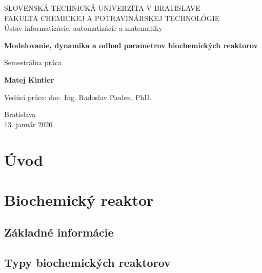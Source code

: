 \documentclass[fleqn]{article}
\begin{document}
	
\begin{titlepage}
	\begin{center}
		\vspace*{1cm}
		\LARGE
		SLOVENSKÁ TECHNICKÁ UNIVERZITA V BRATISLAVE \\
		\Large
		FAKULTA CHEMICKEJ A POTRAVINÁRSKEJ TECHNOLÓGIE \\
		\vspace*{.5cm}
		\large
		Ústav informatizácie, automatizácie a matematiky \\
		\vspace*{5cm}
		
		\Huge
		\textbf{Modelovanie, dynamika a odhad parametrov biochemických reaktorov}
		
		\vspace{0.5cm}
		\LARGE
		Semestrálna práca
		
		\vspace{1.5cm}
		
		\textbf{Matej Kintler}
		
		\vfill

		\large
		Vedúci práce: doc. Ing. Radoslav Paulen, PhD.
		
		\vspace{1.5cm}
	
		\Large
		Bratislava\\
		13. január 2020
		
	\end{center}
\end{titlepage}

\newpage

\tableofcontents
\pagestyle{empty}

\newpage
\pagestyle{plain}

\section{Úvod}


\section{Biochemický reaktor}
\subsection{Základné informácie}


\subsection{Typy biochemických reaktorov}

\end{document}
